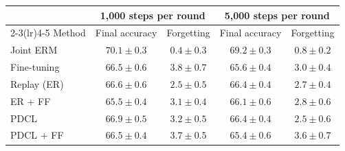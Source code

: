 \begin{tabular}{lcccc}
\toprule
 & \multicolumn{2}{c}{1{,}000 steps per round} & \multicolumn{2}{c}{5{,}000 steps per round} \\
\cmidrule(lr){2-3}\cmidrule(lr){4-5}
Method & Final accuracy & Forgetting & Final accuracy & Forgetting \\
\midrule
Joint ERM & $70.1\pm0.3$ & $0.4\pm0.3$ & $69.2\pm0.3$ & $0.8\pm0.2$ \\
Fine-tuning & $66.5\pm0.6$ & $3.8\pm0.7$ & $65.6\pm0.4$ & $3.0\pm0.4$ \\
Replay (ER) & $66.6\pm0.6$ & $2.5\pm0.5$ & $66.4\pm0.4$ & $2.7\pm0.4$ \\
ER + FF & $65.5\pm0.4$ & $3.1\pm0.4$ & $66.1\pm0.6$ & $2.8\pm0.6$ \\
PDCL & $66.9\pm0.5$ & $3.2\pm0.5$ & $66.4\pm0.4$ & $2.5\pm0.6$ \\
PDCL + FF & $66.5\pm0.4$ & $3.7\pm0.5$ & $65.4\pm0.6$ & $3.6\pm0.7$ \\
\bottomrule
\end{tabular}
